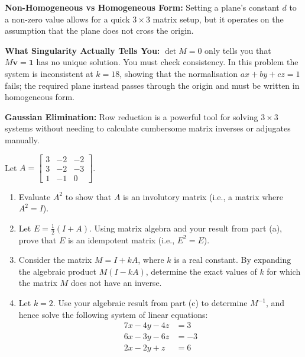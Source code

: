 \begin{takeaways}
\item \textbf{Non-Homogeneous vs Homogeneous Form:} Setting a plane's constant $d$ to a non-zero value allows for a quick $3 \times 3$ matrix setup, but it operates on the assumption that the plane does not cross the origin.
\item \textbf{What Singularity Actually Tells You:} $\det M=0$ only tells you that $M\mathbf v=\mathbf1$ has no unique solution. You must check consistency. In this problem the system is inconsistent at $k=18$, showing that the normalisation $ax+by+cz=1$ fails; the required plane instead passes through the origin and must be written in homogeneous form.
\item \textbf{Gaussian Elimination:} Row reduction is a powerful tool for solving $3 \times 3$ systems without needing to calculate cumbersome matrix inverses or adjugates manually.
\end{takeaways}


\begin{problem}
Let $A = \begin{bmatrix} 3 & -2 & -2 \\ 3 & -2 & -3 \\ 1 & -1 & 0 \end{bmatrix}$.

\begin{enumerate}[label=\textbf{(\alph*)}]
    \item Evaluate $A^2$ to show that $A$ is an involutory matrix (i.e., a matrix where $A^2 = I$).
    \item Let $E = \frac{1}{2}(I + A)$. Using matrix algebra and your result from part (a), prove that $E$ is an idempotent matrix (i.e., $E^2 = E$).
    \item Consider the matrix $M = I + kA$, where $k$ is a real constant. By expanding the algebraic product $M(I - kA)$, determine the exact values of $k$ for which the matrix $M$ does not have an inverse.
    \item Let $k = 2$. Use your algebraic result from part (c) to determine $M^{-1}$, and hence solve the following system of linear equations:
    \begin{align*}
    7x - 4y - 4z &= 3 \\
    6x - 3y - 6z &= -3 \\
    2x - 2y + z &= 6
    \end{align*}
\end{enumerate}
\end{problem}

